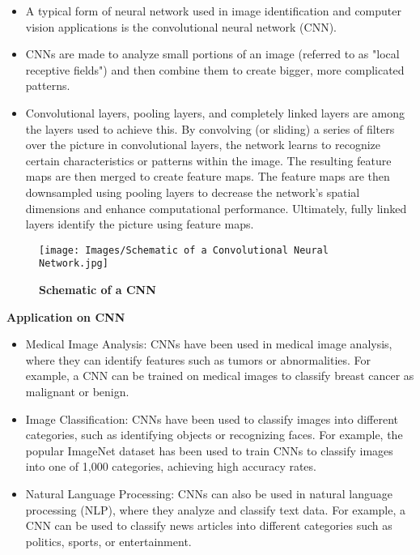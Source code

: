 {
	\begin{itemize}
		\item A typical form of neural network used in image identification and computer vision applications is the convolutional neural network (CNN).
		\item CNNs are made to analyze small portions of an image (referred to as "local receptive fields") and then combine them to create bigger, more complicated patterns.
		\item Convolutional layers, pooling layers, and completely linked layers are among the layers used to achieve this. By convolving (or sliding) a series of filters over the picture in convolutional layers, the network learns to recognize certain characteristics or patterns within the image. The resulting feature maps are then merged to create feature maps. The feature maps are then downsampled using pooling layers to decrease the network's spatial dimensions and enhance computational performance. Ultimately, fully linked layers identify the picture using feature maps.
	\end{itemize}
  
\begin{figure}[h!]
	\texttt{[image: Images/Schematic of a Convolutional Neural Network.jpg]}
	\caption{\textbf{Schematic of a CNN \cite{gasperini:2018}}}
	\label{fig:Schematic of a Convolutional Neural Network}
\end{figure}

}
{ 
 
 	\textbf{Application on CNN} 
 	
 	\begin{itemize}
 		\item Medical Image Analysis: CNNs have been used in medical image analysis, where they can identify features such as tumors or abnormalities. For example, a CNN can be trained on medical images to classify breast cancer as malignant or benign.
 		
 		\item  Image Classification: CNNs have been used to classify images into different categories, such as identifying objects or recognizing faces. For example, the popular ImageNet dataset has been used to train CNNs to classify images into one of 1,000 categories, achieving high accuracy rates.\newpage
 		
 		\item  Natural Language Processing: CNNs can also be used in natural language processing (NLP), where they analyze and classify text data. For example, a CNN can be used to classify news articles into different categories such as politics, sports, or entertainment.		
 	
 	\end{itemize}

}
